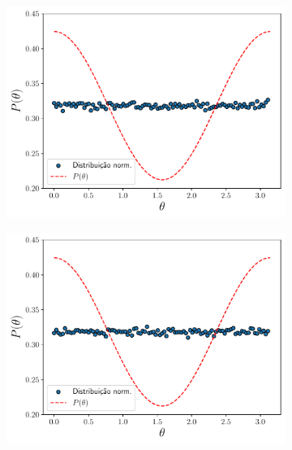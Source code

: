 \documentclass[a4paper, 12pt]{article}
\begin{document}
\begin{figure}[!htb]
    \centering
    \begin{subfigure}{0.48\textwidth}
        \includegraphics[width=\linewidth]{distribuicao_theta_5.pdf}
        \caption{}
        
    \end{subfigure}
    \hfill
    \begin{subfigure}{0.48\textwidth}
        \includegraphics[width=\linewidth]{distribuicao_theta_1.pdf}
        \caption{}
        
    \end{subfigure}


\end{figure}
\end{document}
